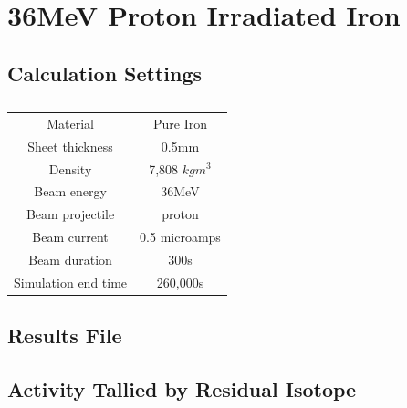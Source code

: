 \FloatBarrier
\clearpage
\section{36MeV Proton Irradiated Iron}
\label{appendix:ironirradiation}


\subsection{Calculation Settings}

\begin{table}[h]
\begin{center}
\begin{tabular}{c c}
\hline\hline
Material & Pure Iron \\
Sheet thickness & 0.5mm \\
Density & 7,808 $kg m^{3}$ \\
Beam energy & 36MeV \\
Beam projectile & proton \\
Beam current & 0.5 microamps \\
Beam duration & 300s \\
Simulation end time & 260,000s \\
\hline\hline
\end{tabular}
\end{center}
\caption{}
\label{table:appendixironsettings}
\end{table}



\subsection{Results File}




\clearpage

\subsection{Activity Tallied by Residual Isotope}

\FloatBarrier


